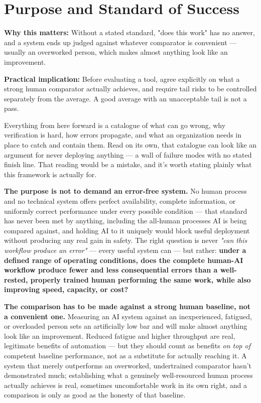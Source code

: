 \section{Purpose and Standard of Success}

\textbf{Why this matters:} Without a stated standard, "does this work" has no answer, and a system ends up judged against whatever comparator is convenient --- usually an overworked person, which makes almost anything look like an improvement.

\textbf{Practical implication:} Before evaluating a tool, agree explicitly on what a strong human comparator actually achieves, and require tail risks to be controlled separately from the average. A good average with an unacceptable tail is not a pass.

Everything from here forward is a catalogue of what can go wrong, why verification is hard, how errors propagate, and what an organization needs in place to catch and contain them. Read on its own, that catalogue can look like an argument for never deploying anything --- a wall of failure modes with no stated finish line. That reading would be a mistake, and it's worth stating plainly what this framework is actually for.

\textbf{The purpose is not to demand an error-free system.} No human process and no technical system offers perfect availability, complete information, or uniformly correct performance under every possible condition --- that standard has never been met by anything, including the all-human processes AI is being compared against, and holding AI to it uniquely would block useful deployment without producing any real gain in safety. The right question is never \emph{"can this workflow produce an error"} --- every useful system can --- but rather: \textbf{under a defined range of operating conditions, does the complete human-AI workflow produce fewer and less consequential errors than a well-rested, properly trained human performing the same work, while also improving speed, capacity, or cost?}

\textbf{The comparison has to be made against a strong human baseline, not a convenient one.} Measuring an AI system against an inexperienced, fatigued, or overloaded person sets an artificially low bar and will make almost anything look like an improvement. Reduced fatigue and higher throughput are real, legitimate benefits of automation --- but they should count as benefits \emph{on top of} competent baseline performance, not as a substitute for actually reaching it. A system that merely outperforms an overworked, undertrained comparator hasn't demonstrated much; establishing what a genuinely well-resourced human process actually achieves is real, sometimes uncomfortable work in its own right, and a comparison is only as good as the honesty of that baseline.

